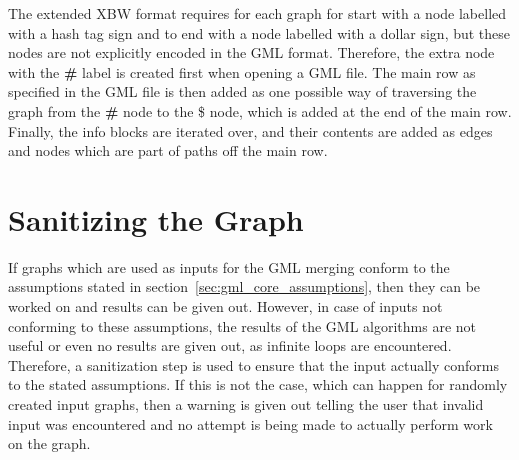 \documentclass[a4paper,12pt,twoside,BCOR=10mm]{scrbook}
\begin{document}
The extended XBW format requires for each graph for start with a node labelled with a 
hash tag sign and to end with a node labelled with a dollar sign, 
but these nodes are not explicitly encoded in the GML format.
Therefore, the extra node with the \textbf{\#} label is created first when opening a GML file. 
The main row as specified in the GML file is then added as one possible way 
of traversing the graph from the \textbf{\#} node to the \$ node, which is added at the end of the main row. \\
Finally, the info blocks are iterated over, and their contents are added as edges and nodes which are part 
of paths off the main row.

\section{Sanitizing the Graph}

If graphs which are used as inputs for the GML merging conform to the assumptions 
stated in section~\ref{sec:gml_core_assumptions}, 
then they can be worked on and results can be given out. 
However, in case of inputs not conforming to these assumptions, the results of the GML algorithms 
are not useful or even no results are given out, as infinite loops are encountered. 
Therefore, a sanitization step is used to ensure that the input actually conforms to the 
stated assumptions. If this is not the case, which can happen for randomly created input graphs, 
then a warning is given out telling the user that invalid input was encountered and 
no attempt is being made to actually perform work on the graph.
\end{document}
